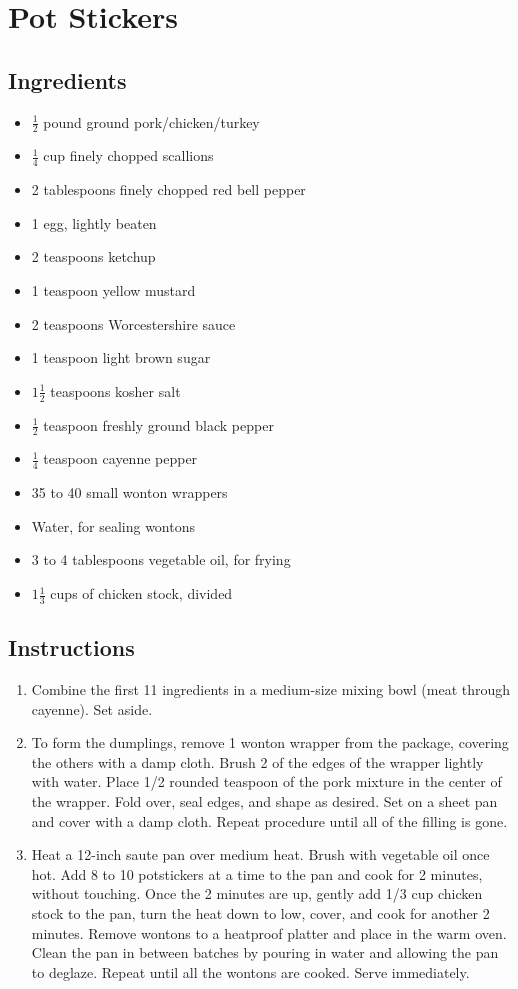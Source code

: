 \documentclass{book}
\begin{document}
\tableofcontents
\newpage
{}
\section*{Pot Stickers}
\subsection*{Ingredients}
\begin{itemize}
\item
$\frac{1}{2}$ pound ground pork/chicken/turkey
\item
$\frac{1}{4}$ cup finely chopped scallions
\item
2 tablespoons finely chopped red bell pepper
\item
1 egg, lightly beaten
\item
2 teaspoons ketchup
\item
1 teaspoon yellow mustard
\item
2 teaspoons Worcestershire sauce
\item
1 teaspoon light brown sugar
\item
$1 \frac{1}{2}$ teaspoons kosher salt
\item
$\frac{1}{2}$ teaspoon freshly ground black pepper
\item
$\frac{1}{4}$ teaspoon cayenne pepper
\item
35 to 40 small wonton wrappers
\item
Water, for sealing wontons
\item
3 to 4 tablespoons vegetable oil, for frying
\item
$1 \frac{1}{3}$ cups of chicken stock, divided
\end{itemize}
\subsection*{Instructions}
\begin{enumerate}
\item
Combine the first 11 ingredients in a medium-size mixing bowl (meat through cayenne). Set aside.
\item
To form the dumplings, remove 1 wonton wrapper from the package, covering the others with a damp cloth. Brush 2 of the edges of the wrapper lightly with water. Place 1/2 rounded teaspoon of the pork mixture in the center of the wrapper. Fold over, seal edges, and shape as desired. Set on a sheet pan and cover with a damp cloth. Repeat procedure until all of the filling is gone.
\item
Heat a 12-inch saute pan over medium heat. Brush with vegetable oil once hot. Add 8 to 10 potstickers at a time to the pan and cook for 2 minutes, without touching. Once the 2 minutes are up, gently add 1/3 cup chicken stock to the pan, turn the heat down to low, cover, and cook for another 2 minutes. Remove wontons to a heatproof platter and place in the warm oven. Clean the pan in between batches by pouring in water and allowing the pan to deglaze. Repeat until all the wontons are cooked. Serve immediately.
\end{enumerate}
\newpage
{}
\end{document}
